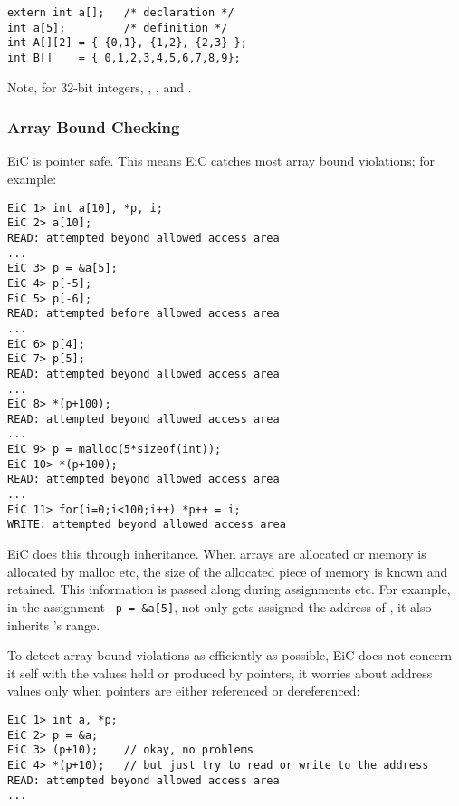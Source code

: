 \begin{production}
\begin{verbatim}
extern int a[];   /* declaration */
int a[5];         /* definition */
int A[][2] = { {0,1}, {1,2}, {2,3} };
int B[]    = { 0,1,2,3,4,5,6,7,8,9}; 
\end{verbatim}
\end{production}

Note, for 32-bit integers, ,
,
 and .


\subsubsection{Array Bound Checking}
\label{sec:ArrayBoundChecking}


EiC is pointer safe. This means EiC catches most array bound
violations; for example:

\begin{production}
\begin{verbatim}
EiC 1> int a[10], *p, i;
EiC 2> a[10];  
READ: attempted beyond allowed access area
...
EiC 3> p = &a[5];
EiC 4> p[-5];
EiC 5> p[-6];
READ: attempted before allowed access area
...
EiC 6> p[4];
EiC 7> p[5];
READ: attempted beyond allowed access area
...
EiC 8> *(p+100);
READ: attempted beyond allowed access area
...
EiC 9> p = malloc(5*sizeof(int));
EiC 10> *(p+100);
READ: attempted beyond allowed access area
...
EiC 11> for(i=0;i<100;i++) *p++ = i;
WRITE: attempted beyond allowed access area
\end{verbatim}
\end{production}

EiC does this through inheritance. When arrays are allocated
or memory is allocated by malloc etc, the size of the allocated
piece of memory is known and retained. This information is
passed along during assignments etc. For example,
in the assignment \verb+ p = &a[5]+,  not only gets assigned
the address of , it also inherits 's range.

To detect array bound violations as efficiently as possible, EiC does
not concern it self with the values held or produced by pointers, it
worries about address values only when pointers are either referenced or
dereferenced:

\begin{production}
\begin{verbatim}
EiC 1> int a, *p;
EiC 2> p = &a;
EiC 3> (p+10);    // okay, no problems
EiC 4> *(p+10);   // but just try to read or write to the address
READ: attempted beyond allowed access area
...
\end{verbatim}
\end{production}



